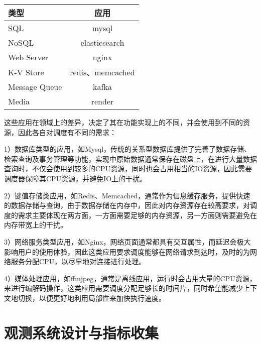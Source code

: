 \begin{table}
    \label{tab:typical_application}
    \footnotesize%
    \setlength{\tabcolsep}{4pt}%
    \renewcommand{\arraystretch}{1.5}%
    \centering
    \begin{tabular}{lc}
        \hline
        类型 & 应用\\
        \hline
        SQL & mysql\\
        NoSQL & elasticsearch\\
        Web Server & nginx\\
        K-V Store & redis、memcached\\
        Message Queue & kafka\\
        Media & render\\
        \hline
    \end{tabular}
\end{table}

这些应用在领域上的差异，决定了其在功能实现上的不同，并会使用到不同的资源，因此各自对调度有不同的需求：

1）数据库类型的应用，如Mysql，传统的关系型数据库提供了完善了数据存储、检索查询及事务管理等功能，实现中原始数据通常保存在磁盘上，在进行大量数据查询时，不仅会使用到较多的CPU资源，同时也会占用相当的IO资源，因此需要调度器保障其CPU资源，并避免IO上的干扰。

2）键值存储类应用，如Redis、Memcached，通常作为信息缓存服务，提供快速的数据存储与查询，由于数据存储在内存中，因此对内存资源存在较高要求，对调度的需求主要体现在两方面，一方面需要足够的内存资源，另一方面则需要避免在内存带宽上的干扰。

3）网络服务类型应用，如Nginx，网络页面通常都具有交互属性，而延迟会极大影响用户的使用体验，因此这类应用要求调度能够在网络请求到达时，及时的为网络服务分配CPU，以尽早地对连接进行处理。

4）媒体处理应用，如ffmjpeg，通常是离线应用，运行时会占用大量的CPU资源，来进行编解码操作，这类应用需要调度分配足够长的时间片，同时希望能减少上下文地切换，以便更好地利用局部性来加快执行速度。

\section{观测系统设计与指标收集}

